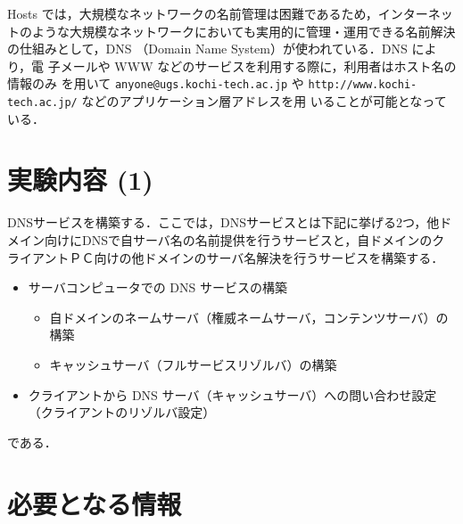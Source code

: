 Hosts では，大規模なネットワークの名前管理は困難であるため，インターネッ
トのような大規模なネットワークにおいても実用的に管理・運用できる名前解決
の仕組みとして，DNS （Domain Name System）が使われている．DNS により，電
子メールや WWW などのサービスを利用する際に，利用者はホスト名の情報のみ
を用いて \verb|anyone@ugs.kochi-tech.ac.jp| や 
\verb|http://www.kochi-tech.ac.jp/| などのアプリケーション層アドレスを用
いることが可能となっている．

\section{実験内容 (1)}

DNSサービスを構築する．ここでは，DNSサービスとは下記に挙げる2つ，他ドメイン向けにDNSで自サーバ名の名前提供を行うサービスと，自ドメインのクライアントＰＣ向けの他ドメインのサーバ名解決を行うサービスを構築する．

\begin{itemize}
  \item サーバコンピュータでの DNS サービスの構築
	\begin{itemize}
	 \item 自ドメインのネームサーバ（権威ネームサーバ，コンテンツサーバ）の構築
	 \item キャッシュサーバ（フルサービスリゾルバ）の構築
	\end{itemize}
  \item クライアントから DNS サーバ（キャッシュサーバ）への問い合わせ設定（クライアントのリゾルバ設定）
\end{itemize}
である．

\section{必要となる情報}
